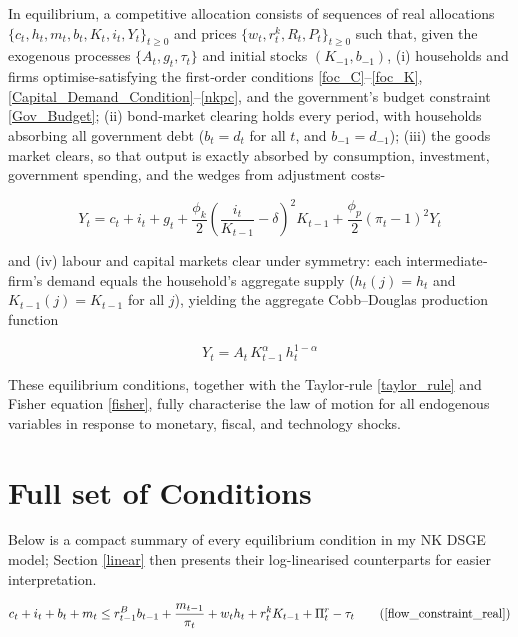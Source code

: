 \documentclass[11pt,preprint]{elsarticle}
\numberwithin{equation}{section}
\numberwithin{figure}{section}
\numberwithin{table}{section}
\begin{document}
In equilibrium, a competitive allocation consists of sequences of real
allocations \(\{c_t,h_t,m_t,b_t,K_t,i_t,Y_t\}_{t\ge0}\) and prices
\(\{w_t,r^k_t,R_t,P_t\}_{t\ge0}\) such that, given the exogenous
processes \(\{A_t,g_t,\tau_t\}\) and initial stocks \((K_{-1},b_{-1})\),
(i) households and firms optimise-satisfying the first‐order conditions
\eqref{foc_C}--\eqref{foc_K},
\eqref{Capital_Demand_Condition}--\eqref{nkpc}, and the government's
budget constraint \eqref{Gov_Budget}; (ii) bond‐market clearing holds
every period, with households absorbing all government debt (\(b_t=d_t\)
for all \(t\), and \(b_{-1}=d_{-1}\)); (iii) the goods market clears, so
that output is exactly absorbed by consumption, investment, government
spending, and the wedges from adjustment costs-

\begin{equation}
   Y_t = c_t + i_t + g_t + \frac{\phi_k}{2} \left( \frac{i_t}{K_{t-1}} - \delta \right)^2 K_{t-1} + \frac{\phi_p}{2} (\pi_t - 1)^2 Y_t
   \label{clearing_resource_constraint}
\end{equation}

and (iv) labour and capital markets clear under symmetry: each
intermediate‐firm's demand equals the household's aggregate supply
(\(h_t(j)=h_t\) and \(K_{t-1}(j)=K_{t-1}\) for all \(j\)), yielding the
aggregate Cobb--Douglas production function

\begin{equation}
Y_t = A_t\,K_{t-1}^{\alpha}\,h_t^{1-\alpha}
\label{aggregate_production}
\end{equation}

These equilibrium conditions, together with the Taylor‐rule
\eqref{taylor_rule} and Fisher equation \eqref{fisher}, fully
characterise the law of motion for all endogenous variables in response
to monetary, fiscal, and technology shocks.

\section{Full set of Conditions}\label{full-set-of-conditions}

Below is a compact summary of every equilibrium condition in my NK DSGE
model; Section \ref{linear} then presents their log-linearised
counterparts for easier interpretation.

\begingroup
\small
\setlength{\abovedisplayskip}{1pt}
\setlength{\belowdisplayskip}{1pt}

\begin{equation}
c_t + i_t + b_t + m_t \leq r^B_{t-1}b_{t-1} + \dfrac{m_{t-1}}{\pi_t} + w_t h_t + r^k_t K_{t-1} + \Pi^r_t - \tau_t
\tag{\ref{flow_constraint_real}}
\end{equation}
\end{document}
